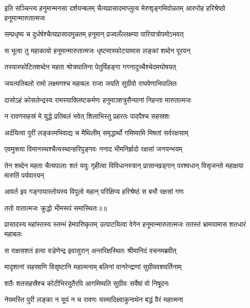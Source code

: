 \threelineshloka
{इति सञ्चिन्त्य हनुमान्मनसा दर्शयन्बलम्}
{चैत्यप्रासादमाप्लुत्य मेरुशृङ्गमिवोन्नतम्}
{आरुरोह हरिश्रेष्ठो हनूमान्मारुतात्मजः} %

\twolineshloka
{सम्प्रधृष्य च दुर्धर्षश्चैत्यप्रासादमुन्नतम्}
{हनूमान् प्रज्वलँल्लक्ष्म्या पारियात्रोपमोऽभवत्} %

\twolineshloka
{स भूत्वा तु महाकायो हनूमान्मारुतात्मजः}
{धृष्टमास्फोटयामास लङ्कां शब्देन पूरयन्} %

\twolineshloka
{तस्यास्फोटितशब्देन महता श्रोत्रघातिना}
{पेतुर्विहङ्गा गगनादुच्चैश्चेदमघोषयत्} %

\twolineshloka
{जयत्यतिबलो रामो लक्ष्मणश्च महाबलः}
{राजा जयति सुग्रीवो राघवेणाभिपालितः} %

\twolineshloka
{दासोऽहं कोसलेन्द्रस्य रामस्याक्लिष्टकर्मणः}
{हनुमाञ्शत्रुसैन्यानां निहन्ता मारुतात्मजः} %

\twolineshloka
{न रावणसहस्रं मे युद्धे प्रतिबलं भवेत्}
{शिलाभिस्तु प्रहरतः पादपैश्च सहस्रशः} %

\twolineshloka
{अर्दयित्वा पुरीं लङ्कामभिवाद्य च मैथिलीम्}
{समृद्धार्थो गमिष्यामि मिषतां सर्वरक्षसाम्} %

\twolineshloka
{एवमुक्त्वा विमानस्थश्चैत्यस्थान्हरिपुङ्गवः}
{ननाद भीमनिर्ह्रादो रक्षसां जनयन्भयम्} %

\threelineshloka
{तेन शब्देन महता चैत्यपालाः शतं ययुः}
{गृहीत्वा विविधानस्त्रान् प्रासान्खड्गान् परश्वधान्}
{विसृजन्तो महाक्षया मारुतिं पर्यवारयन्} %

\twolineshloka
{आवर्त इव गङ्गायास्तोयस्य विपुलो महान्}
{परिक्षिप्य हरिश्रेष्ठं स बभौ रक्षसां गणः} %

{ततो वातात्मजः क्रुद्धो भीमरूपं समास्थितः॥॥} %

\addtocounter{shlokacount}{1}

\threelineshloka
{प्रासादस्य महांस्तस्य स्तम्भं हेमपरिष्कृतम्}
{उत्पाटयित्वा वेगेन हनूमान्मारुतात्मजः}
{ततस्तं भ्रामयामास शतधारं महाबलः} %

\twolineshloka
{स राक्षसशतं हत्वा वज्रेणेन्द्र इवासुरान्}
{अन्तरिक्षस्थितः श्रीमानिदं वचनमब्रवीत्} %

\twolineshloka
{मादृशानां सहस्राणि विसृष्टानि महात्मनाम्}
{बलिनां वानरेन्द्राणां सुग्रीववशवर्तिनाम्} %

\twolineshloka
{शतैः शतसहस्रैश्च कोटीभिरयुतैरपि}
{आगमिष्यति सुग्रीवः सर्वेषां वो निषूदनः} %

\twolineshloka
{नेयमस्ति पुरी लङ्का न यूयं न च रावणः}
{यस्मादिक्ष्वाकुनाथेन बद्धं वैरं महात्मना} %


